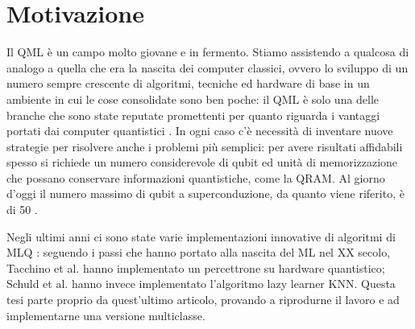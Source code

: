 
\section{Motivazione}

Il \ac{QML} è un campo molto giovane e in fermento. Stiamo assistendo a qualcosa di 
analogo a quella che era la nascita dei computer classici, ovvero lo sviluppo di un 
numero sempre crescente di algoritmi, tecniche ed hardware di base in 
un ambiente in cui le cose consolidate sono ben poche: il \ac{QML} è solo una 
delle branche che sono state reputate promettenti per quanto riguarda i vantaggi 
portati dai computer quantistici \cite{what-is-ibm-q}. 
In ogni caso c'è necessità di inventare nuove strategie per risolvere anche i 
problemi più semplici: per avere risultati affidabili spesso si richiede un 
numero considerevole di qubit ed unità di memorizzazione che possano conservare 
informazioni quantistiche, come la \ac{QRAM}. 
Al giorno d'oggi il numero massimo di qubit a superconduzione, da quanto viene 
riferito, è di 50 \cite{50qubit}. 

Negli ultimi anni ci sono state varie implementazioni innovative di algoritmi di \ac{MLQ} \cite{quantum-advantage}: 
seguendo i passi che hanno portato alla nascita del \ac{ML} nel XX secolo, 
Tacchino et al. \cite{tacchino} hanno implementato un percettrone su hardware quantistico;
Schuld et al. \cite{schuld} hanno invece implementato l'algoritmo lazy learner \ac{KNN}. 
Questa tesi parte proprio da quest'ultimo articolo, provando a riprodurne il lavoro e ad 
implementarne una versione multiclasse. 


